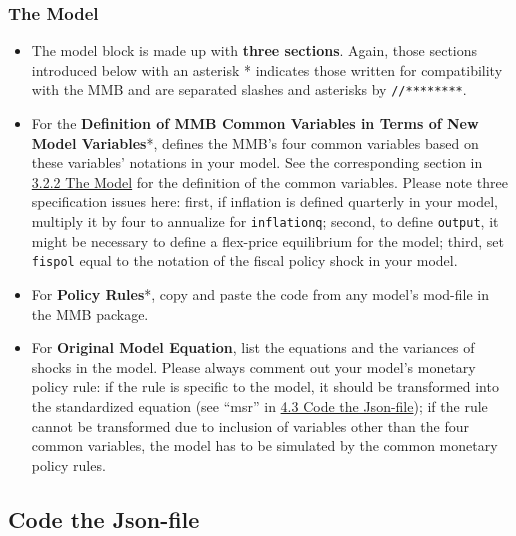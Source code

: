 \documentclass[10pt,a4paper]{article}
\begin{document}
\subsubsection{The Model}
\medskip
\begin{itemize}
\item The model block is made up with \textbf{three sections}. Again, those sections introduced below with an asterisk * indicates those written for compatibility with the MMB and are separated slashes and asterisks by \texttt{//********}.

\item For the \textbf{Definition of MMB Common Variables in Terms of New Model Variables}*, defines the MMB’s four common variables based on these variables’ notations in your model. See the corresponding section in \hyperref[sec:Model]{3.2.2 The Model} for the definition of the common variables. Please note three specification issues here: first, if inflation is defined quarterly in your model, multiply it by four to annualize for \texttt{inflationq}; second, to define \texttt{output}, it might be necessary to define a flex-price equilibrium for the model; third, set \texttt{fispol} equal to the notation of the fiscal policy shock in your model.

\item For \textbf{Policy Rules}*, copy and paste the code from any model’s mod-file in the MMB package.

\item For \textbf{Original Model Equation}, list the equations and the variances of shocks in the model. Please always comment out your model’s monetary policy rule: if the rule is specific to the model, it should be transformed into the standardized equation (see “msr” in \hyperref[sec:Step3]{4.3 Code the Json-file}); if the rule cannot be transformed due to inclusion of variables other than the four common variables, the model has to be simulated by the common monetary policy rules.
\end{itemize}

\subsection{Code the Json-file}
\label{sec:Step3}
\medskip
\end{document}
